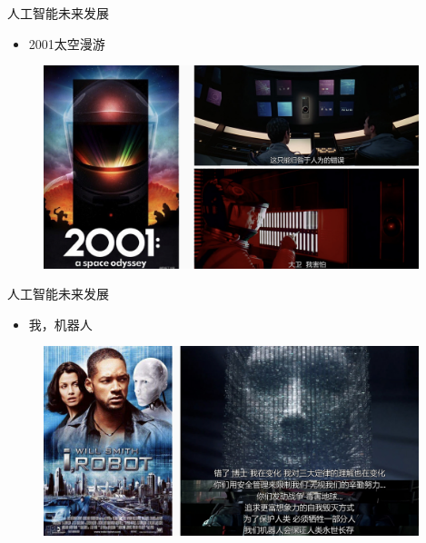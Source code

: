 \documentclass{beamer}
\begin{document}
   \begin{frame}{人工智能未来发展}
    \begin{itemize}
     \item 2001太空漫游
    \end{itemize}
   \begin{figure}[H]
   \centering
   \includegraphics[width=4.3in]{cdjPic2.jpg}
   \end{figure}
  \end{frame}

   \begin{frame}{人工智能未来发展}
    \begin{itemize}
     \item 我，机器人
    \end{itemize}
   \begin{figure}[H]
   \centering
   \includegraphics[width=4.3in]{cdjPic3.jpg}
   \end{figure}
  \end{frame}
\end{document}
